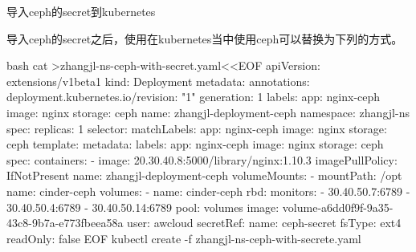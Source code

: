 \begin{outline}[enumerate]
\1 导入ceph的secret到kubernetes
导入ceph的secret之后，使用在kubernetes当中使用ceph可以替换为下列的方式。
\begin{code-block}{bash}
cat >zhangjl-ns-ceph-with-secret.yaml<<EOF
apiVersion: extensions/v1beta1
kind: Deployment
metadata:
  annotations:
    deployment.kubernetes.io/revision: "1"
  generation: 1
  labels:
    app: nginx-ceph
    image: nginx
    storage: ceph
  name: zhangjl-deployment-ceph
  namespace: zhangjl-ns
spec:
  replicas: 1
  selector:
    matchLabels:
      app: nginx-ceph
      image: nginx
      storage: ceph
  template:
    metadata:
      labels:
        app: nginx-ceph
        image: nginx
        storage: ceph
    spec:
      containers:
      - image: 20.30.40.8:5000/library/nginx:1.10.3
        imagePullPolicy: IfNotPresent
        name: zhangjl-deployment-ceph
        volumeMounts:
        - mountPath: /opt
          name: cinder-ceph
      volumes:
      - name: cinder-ceph
        rbd:
          monitors:
          - 30.40.50.7:6789
          - 30.40.50.4:6789
          - 30.40.50.14:6789
          pool: volumes
          image: volume-a6dd0f9f-9a35-43c8-9b7a-e773fbeea58a
          user: awcloud
          secretRef:
            name: ceph-secret
          fsType: ext4
          readOnly: false
EOF
kubectl create -f zhangjl-ns-ceph-with-secrete.yaml
\end{code-block}

\end{outline}
